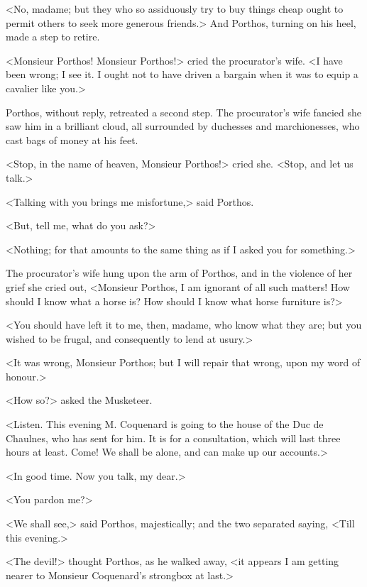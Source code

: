 <No, madame; but they who so assiduously try to buy things cheap ought to permit others to seek more generous friends.> And Porthos, turning on his heel, made a step to retire. 

<Monsieur Porthos! Monsieur Porthos!> cried the procurator's wife. <I have been wrong; I see it. I ought not to have driven a bargain when it was to equip a cavalier like you.> 

Porthos, without reply, retreated a second step. The procurator's wife fancied she saw him in a brilliant cloud, all surrounded by duchesses and marchionesses, who cast bags of money at his feet. 

<Stop, in the name of heaven, Monsieur Porthos!> cried she. <Stop, and let us talk.> 

<Talking with you brings me misfortune,> said Porthos. 

<But, tell me, what do you ask?> 

<Nothing; for that amounts to the same thing as if I asked you for something.> 

The procurator's wife hung upon the arm of Porthos, and in the violence of her grief she cried out, <Monsieur Porthos, I am ignorant of all such matters! How should I know what a horse is? How should I know what horse furniture is?> 

<You should have left it to me, then, madame, who know what they are; but you wished to be frugal, and consequently to lend at usury.> 

<It was wrong, Monsieur Porthos; but I will repair that wrong, upon my word of honour.> 

<How so?> asked the Musketeer. 

<Listen. This evening M. Coquenard is going to the house of the Duc de Chaulnes, who has sent for him. It is for a consultation, which will last three hours at least. Come! We shall be alone, and can make up our accounts.> 

<In good time. Now you talk, my dear.> 

<You pardon me?> 

<We shall see,> said Porthos, majestically; and the two separated saying, <Till this evening.> 

<The devil!> thought Porthos, as he walked away, <it appears I am getting nearer to Monsieur Coquenard's strongbox at last.> 
